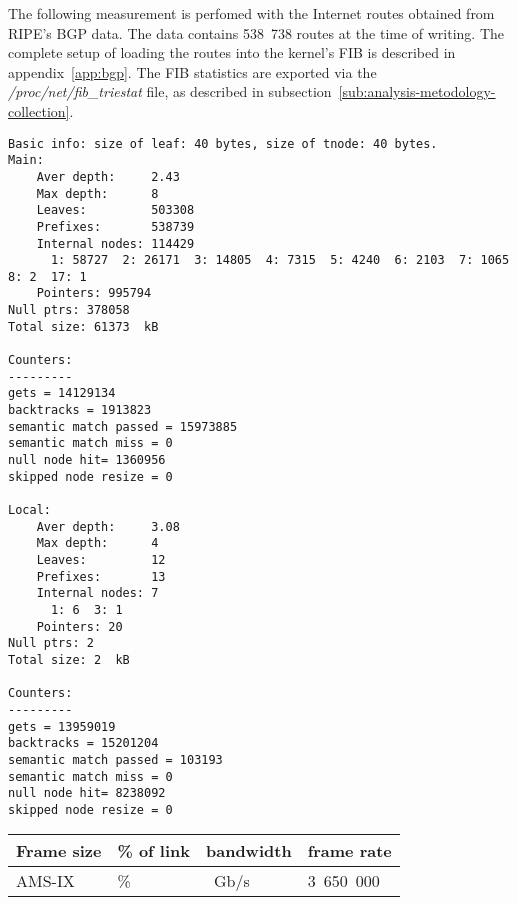 
The following measurement is perfomed with the Internet routes obtained from RIPE's BGP data.
The data contains 538~738 routes at the time of writing.
The complete setup of loading the routes into the kernel's FIB is described in appendix~\ref{app:bgp}.
The FIB statistics are exported via the {\it{/proc/net/fib\_triestat}} file, as described in
subsection~\ref{sub:analysis-metodology-collection}.
\begin{lstlisting}
Basic info: size of leaf: 40 bytes, size of tnode: 40 bytes.
Main:
	Aver depth:     2.43
	Max depth:      8
	Leaves:         503308
	Prefixes:       538739
	Internal nodes: 114429
	  1: 58727  2: 26171  3: 14805  4: 7315  5: 4240  6: 2103  7: 1065  8: 2  17: 1
	Pointers: 995794
Null ptrs: 378058
Total size: 61373  kB

Counters:
---------
gets = 14129134
backtracks = 1913823
semantic match passed = 15973885
semantic match miss = 0
null node hit= 1360956
skipped node resize = 0

Local:
	Aver depth:     3.08
	Max depth:      4
	Leaves:         12
	Prefixes:       13
	Internal nodes: 7
	  1: 6  3: 1
	Pointers: 20
Null ptrs: 2
Total size: 2  kB

Counters:
---------
gets = 13959019
backtracks = 15201204
semantic match passed = 103193
semantic match miss = 0
null node hit= 8238092
skipped node resize = 0
\end{lstlisting}

\begin{tabular}{ | l | l | l | l | }
\hline
Frame size & \% of link & bandwidth & frame rate \\
\hline
AMS-IX & \% & ~Gb/s & 3~650~000 \\
\hline
\end{tabular}

